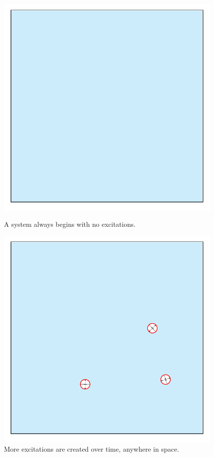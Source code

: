 \begin{frame}
\begin{columns}[T]
\begin{column}[T]{0.5\textwidth}
\begin{figure}[t]
\begin{overprint}
\includegraphics[width=0.95\linewidth]{d.1-fac_intro/bare_test_0.pdf}\vspace{-10pt}\caption{A system always begins with no excitations.}

\includegraphics[width=0.95\linewidth]{d.1-fac_intro/bare_test_3.pdf}\vspace{-10pt}\caption{More excitations are created over time, anywhere in space.}


\end{overprint}
\end{figure}
\end{column}
\end{columns}
\end{frame}
